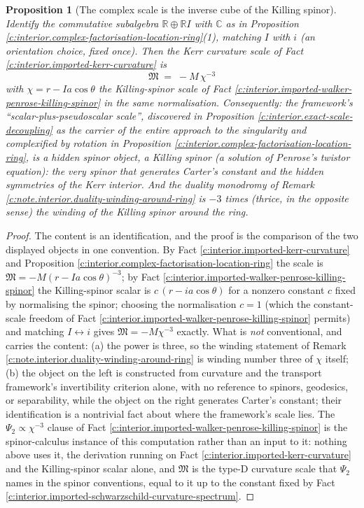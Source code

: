 \documentclass[11pt]{article}
\newtheorem{proposition}[theorem]{Proposition}
\theoremstyle{definition}
\theoremstyle{plain}
\newcommand{\changedmark}[2]{\marginpar{\raggedright\scriptsize\color{#1}#2}}
\providecommand{\C}{}\renewcommand{\C}{\mathbb{C}}
\providecommand{\R}{}\renewcommand{\R}{\mathbb{R}}
\begin{document}
\begin{proposition}[The complex scale is the inverse cube of the Killing spinor]\label{c:interior.complex-scale-inverse-cube-killing-spinor}
\changedmark{BrickRed}{corrected since the deposit}
Identify the commutative subalgebra $\R \oplus \R I$ with $\C$ as in Proposition \ref{c:interior.complex-factorisation-location-ring}(1), matching $I$ with $i$ (an orientation choice, fixed once). Then the Kerr curvature scale of Fact \ref{c:interior.imported-kerr-curvature} is
\[
\mathfrak M \;=\; -M\,\chi^{-3}
\]
with $\chi = r - Ia\cos\theta$ the Killing-spinor scale of Fact \ref{c:interior.imported-walker-penrose-killing-spinor} in the same normalisation. Consequently: the framework's ``scalar-plus-pseudoscalar scale'', discovered in Proposition \ref{c:interior.exact-scale-decoupling} as the carrier of the entire approach to the singularity and complexified by rotation in Proposition \ref{c:interior.complex-factorisation-location-ring}, is a hidden spinor object, a Killing spinor (a solution of Penrose's twistor equation): the very spinor that generates Carter's constant and the hidden symmetries of the Kerr interior. And the duality monodromy of Remark \ref{c:note.interior.duality-winding-around-ring} is $-3$ times (thrice, in the opposite sense) the winding of the Killing spinor around the ring.
\end{proposition}
\begin{proof}
The content is an identification, and the proof is the comparison of the two displayed objects in one convention. By Fact \ref{c:interior.imported-kerr-curvature} and Proposition \ref{c:interior.complex-factorisation-location-ring} the scale is $\mathfrak M = -M(r - Ia\cos\theta)^{-3}$; by Fact \ref{c:interior.imported-walker-penrose-killing-spinor} the Killing-spinor scalar is $c\,(r - ia\cos\theta)$ for a nonzero constant $c$ fixed by normalising the spinor; choosing the normalisation $c = 1$ (which the constant-scale freedom of Fact \ref{c:interior.imported-walker-penrose-killing-spinor} permits) and matching $I \leftrightarrow i$ gives $\mathfrak M = -M\chi^{-3}$ exactly. What is \emph{not} conventional, and carries the content: (a) the power is three, so the winding statement of Remark \ref{c:note.interior.duality-winding-around-ring} is winding number three of $\chi$ itself; (b) the object on the left is constructed from curvature and the transport framework's invertibility criterion alone, with no reference to spinors, geodesics, or separability, while the object on the right generates Carter's constant; their identification is a nontrivial fact about where the framework's scale lies. The $\Psi_2 \propto \chi^{-3}$ clause of Fact \ref{c:interior.imported-walker-penrose-killing-spinor} is the spinor-calculus instance of this computation rather than an input to it: nothing above uses it, the derivation running on Fact \ref{c:interior.imported-kerr-curvature} and the Killing-spinor scalar alone, and $\mathfrak M$ is the type-D curvature scale that $\Psi_2$ names in the spinor conventions, equal to it up to the constant fixed by Fact \ref{c:interior.imported-schwarzschild-curvature-spectrum}.

\end{proof}
\end{document}

